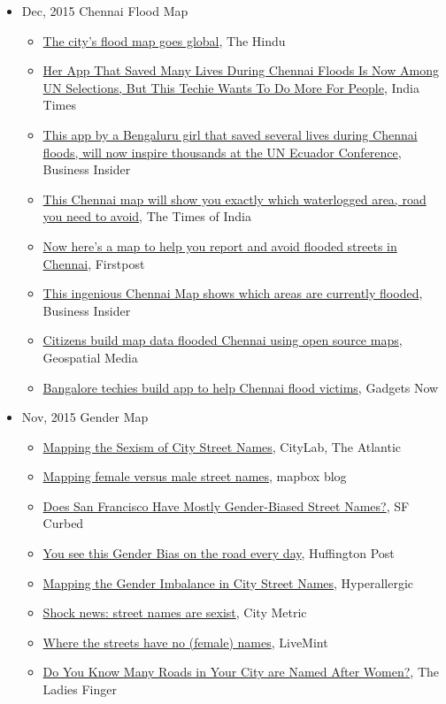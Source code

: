\documentclass{scrartcl}
\newenvironment{myitemize}
{ \begin{itemize}
    \footnotesize\setlength{\itemsep}{0pt}
    \footnotesize\setlength{\parskip}{0pt}
    \footnotesize\setlength{\parsep}{0pt}     }
{ \end{itemize}                  }  %
\begin{document}
\begin{cv}{}
\centering{}
\begin{myitemize}
  \item {Dec, 2015} {Chennai Flood Map}
    \begin{myitemize}
      \item \href{https://tinyurl.com/y8zmhjb8}{The city’s flood map goes global}, The Hindu 
      \item \href{https://tinyurl.com/yagtulwt}{Her App That Saved Many Lives During Chennai Floods Is Now Among UN Selections, But This Techie Wants To Do More For People}, India Times
      \item \href{https://tinyurl.com/y94mduyo}{This app by a Bengaluru girl that saved several lives during Chennai floods, will now inspire thousands at the UN Ecuador Conference}, Business Insider
      \item \href{https://tinyurl.com/y9hv33go}{This Chennai map will show you exactly which waterlogged area, road you need to avoid}, The Times of India
      \item \href{https://tinyurl.com/zj77c24}{Now here's a map to help you report and avoid flooded streets in Chennai}, Firstpost
      \item \href{https://tinyurl.com/y9b8uof6}{This ingenious Chennai Map shows which areas are currently flooded}, Business Insider
      \item \href{https://tinyurl.com/y9l2hve9}{Citizens build map data flooded Chennai using open source maps}, Geospatial Media
      \item \href{https://tinyurl.com/y8jznfc8}{Bangalore techies build app to help Chennai flood victims}, Gadgets Now
    \end{myitemize}
  \item {Nov, 2015} {Gender Map}
    \begin{myitemize}
      \item \href{https://tinyurl.com/ybrjjmbq}{Mapping the Sexism of City Street Names}, CityLab, The Atlantic
      \item \href{https://tinyurl.com/y6urpyzs}{Mapping female versus male street names}, mapbox blog
      \item \href{https://tinyurl.com/y9mrf4yp}{Does San Francisco Have Mostly Gender-Biased Street Names?}, SF Curbed
      \item \href{https://tinyurl.com/ybsqcmv5}{You see this Gender Bias on the road every day}, Huffington Post
      \item \href{https://tinyurl.com/yabajxj2}{Mapping the Gender Imbalance in City Street Names}, Hyperallergic
      \item \href{https://tinyurl.com/ycpn4hmw}{Shock news: street names are sexist}, City Metric
      \item \href{https://tinyurl.com/jypreu7}{Where the streets have no (female) names}, LiveMint
      \item \href{https://tinyurl.com/ya93krx2}{Do You Know Many Roads in Your City are Named After Women?}, The Ladies Finger
   \end{myitemize}
\end{myitemize}


\end{cv}
\end{document}
